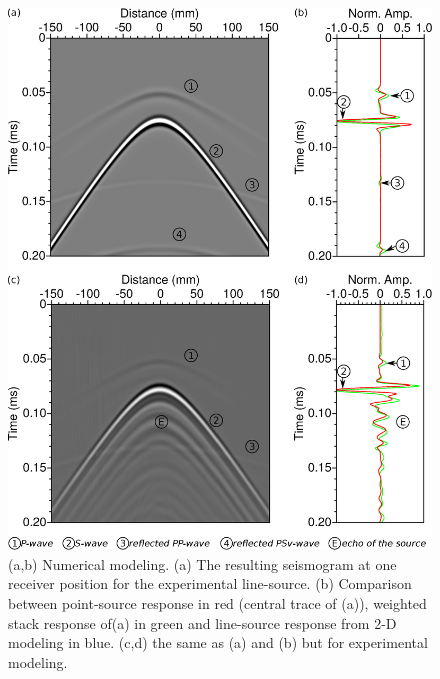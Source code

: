 \documentclass[paper,extra]{gji} %
\newcommand{\twod}{2-D }
\begin{document}
\begin{figure}[!h]
\centering
\includegraphics[width=0.75\columnwidth]{fig/amplitude_stack_principle.eps}
\caption{(a,b) Numerical modeling. (a) The resulting seismogram at one receiver position for the experimental line-source. (b) Comparison between point-source response in red (central trace of (a)), weighted stack response of(a) in green and line-source response from \twod modeling in blue. (c,d) the same as (a) and (b) but for experimental modeling.}
\label{amplitude_stack_principle}
\end{figure}
\end{document}
